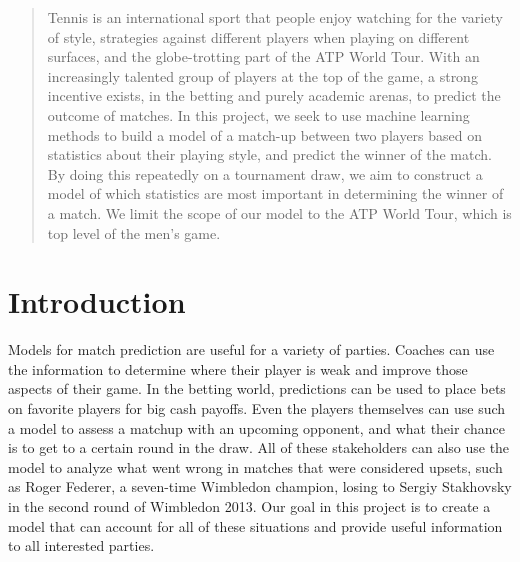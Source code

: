 \documentclass[conference]{IEEEtran}
\begin{document}




\maketitle

\begin{abstract}
    Tennis is an international sport that people enjoy watching for the variety of style, strategies against different players when playing on different surfaces, and the globe-trotting part of the ATP World Tour. With an increasingly talented group of players at the top of the game, a strong incentive exists, in the betting and purely academic arenas, to predict the outcome of matches. In this project, we seek to use machine learning methods to build a model of a match-up between two players based on statistics about their playing style, and predict the winner of the match. By doing this repeatedly on a tournament draw, we aim to construct a model of which statistics are most important in determining the winner of a match. We limit the scope of our model to the ATP World Tour, which is top level of the men’s game.
\end{abstract}





%
\IEEEpeerreviewmaketitle



\section{Introduction}
Models for match prediction are useful for a variety of parties. Coaches can use the information to determine where their player is weak and improve those aspects of their game. In the betting world, predictions can be used to place bets on favorite players for big cash payoffs. Even the players themselves can use such a model to assess a matchup with an upcoming opponent, and what their chance is to get to a certain round in the draw. All of these stakeholders can also use the model to analyze what went wrong in matches that were considered upsets, such as Roger Federer, a seven-time Wimbledon champion, losing to Sergiy Stakhovsky in the second round of Wimbledon 2013. Our goal in this project is to create a model that can account for all of these situations and provide useful information to all interested parties.
\end{document}

